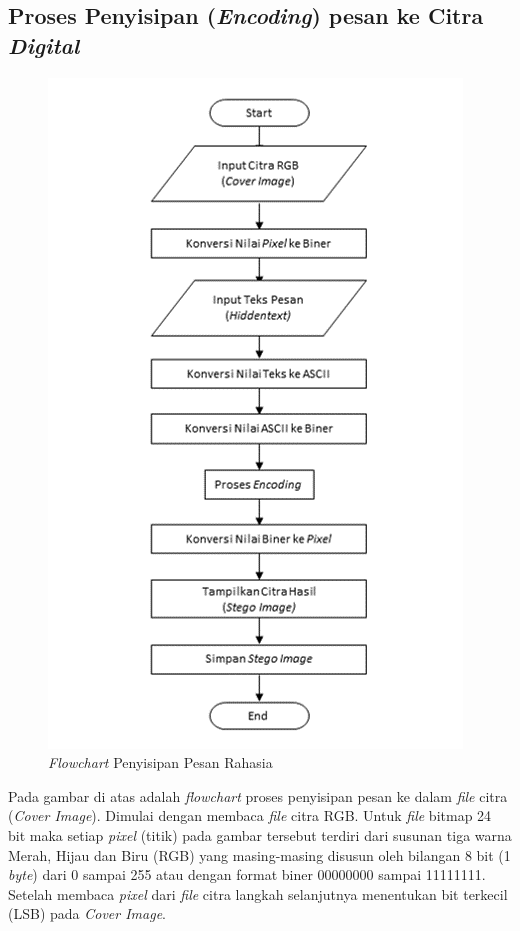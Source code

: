 	\subsection{Proses Penyisipan (\emph{Encoding}) pesan ke Citra \emph{Digital}}
	
	\begin{figure}[H]
		\centering
		\includegraphics[height=0.8\textheight]{gambar/penyisipan3}
		\caption{\emph{Flowchart} Penyisipan Pesan Rahasia}
		\label{flowchart_penyisipan}
	\end{figure}

	Pada gambar di atas adalah \emph{flowchart} proses penyisipan pesan ke dalam \emph{file}
	citra (\emph{Cover Image}). Dimulai dengan membaca \emph{file} citra RGB. Untuk \emph{file} bitmap 24 bit maka setiap \emph{pixel} (titik) pada gambar tersebut terdiri dari susunan
	tiga warna Merah, Hijau dan Biru (RGB) yang masing-masing disusun oleh bilangan 8 bit
	(1 \emph{byte}) dari 0 sampai 255 atau dengan format biner 00000000 sampai 11111111. Setelah
	membaca \emph{pixel} dari \emph{file} citra langkah selanjutnya menentukan bit terkecil (LSB) pada \emph{Cover Image}.
	
